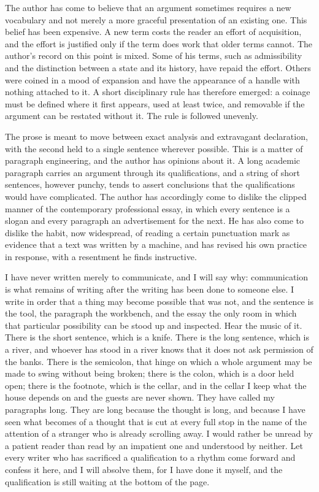 \documentclass[11pt,openany,twoside]{book}
\theoremstyle{plain}
\theoremstyle{definition}
\theoremstyle{remark}
\begin{document}
The author has come to believe that an argument sometimes requires a new vocabulary and not merely a more graceful presentation of an existing one. This belief has been expensive. A new term costs the reader an effort of acquisition, and the effort is justified only if the term does work that older terms cannot. The author's record on this point is mixed. Some of his terms, such as admissibility and the distinction between a state and its history, have repaid the effort. Others were coined in a mood of expansion and have the appearance of a handle with nothing attached to it. A short disciplinary rule has therefore emerged: a coinage must be defined where it first appears, used at least twice, and removable if the argument can be restated without it. The rule is followed unevenly.

The prose is meant to move between exact analysis and extravagant declaration, with the second held to a single sentence wherever possible. This is a matter of paragraph engineering, and the author has opinions about it. A long academic paragraph carries an argument through its qualifications, and a string of short sentences, however punchy, tends to assert conclusions that the qualifications would have complicated. The author has accordingly come to dislike the clipped manner of the contemporary professional essay, in which every sentence is a slogan and every paragraph an advertisement for the next. He has also come to dislike the habit, now widespread, of reading a certain punctuation mark as evidence that a text was written by a machine, and has revised his own practice in response, with a resentment he finds instructive.

I have never written merely to communicate, and I will say why: communication is what remains of writing after the writing has been done to someone else. I write in order that a thing may become possible that was not, and the sentence is the tool, the paragraph the workbench, and the essay the only room in which that particular possibility can be stood up and inspected. Hear the music of it. There is the short sentence, which is a knife. There is the long sentence, which is a river, and whoever has stood in a river knows that it does not ask permission of the banks. There is the semicolon, that hinge on which a whole argument may be made to swing without being broken; there is the colon, which is a door held open; there is the footnote, which is the cellar, and in the cellar I keep what the house depends on and the guests are never shown. They have called my paragraphs long. They are long because the thought is long, and because I have seen what becomes of a thought that is cut at every full stop in the name of the attention of a stranger who is already scrolling away. I would rather be unread by a patient reader than read by an impatient one and understood by neither. Let every writer who has sacrificed a qualification to a rhythm come forward and confess it here, and I will absolve them, for I have done it myself, and the qualification is still waiting at the bottom of the page.
\end{document}
